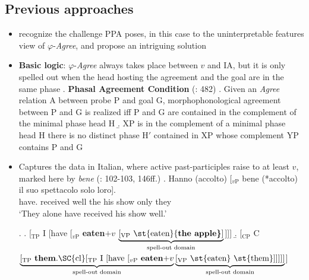 \documentclass[letterpaper,10pt]{handout_nick}
\begin{document}
\subsection{Previous approaches}
\begin{itemize}
\item \citet{dallessandro08} recognize the challenge PPA poses, in this case to the uninterpretable features view of $\varphi$-\emph{Agree}, and propose an intriguing solution
\item {\bf Basic logic}: $\varphi$-\emph{Agree} always takes place between $v$ and IA, but it is only spelled out when the head hosting the agreement and the goal are in the same phase 
\ex. {\bf Phasal Agreement Condition} (\citealt{dallessandro08}: 482)
\a. Given an \emph{Agree} relation A between probe P and goal G, morphophonological agreement between P and G is realized iff P and G are contained in the complement of the minimal phase head H
\b. XP is in the complement of a minimal phase head H there is no distinct phase H$'$ contained in XP whose complement YP contains P and G  

\item Captures the data in Italian, where active past-participles raise to at least $v$, marked here by \emph{bene} (\citealt{cinque99}: 102-103, 146ff.) 
\ex. Hanno (accolto) [$_\text{$v$P}$ bene (*accolto) il suo spettacolo solo loro]. \\
have. received { } well { } the his show only they \\
`They alone have received his show well.'

\ex. \a. [$_\text{TP}$ I [have [$_\text{$v$P}$ {\bf eaten$+v$} $\underbrace{\text{[$_\text{VP}$ \st{eaten} {\bf the apple}]}}_\text{spell-out domain}$]]]
\b. [$_\text{CP}$ C $\underbrace{\text{[$_\text{TP}$ {\bf them}.\SC{cl} [$_\text{TP}$ I [have [$_\text{$v$P}$ {\bf eaten$+v$}}}_\text{spell-out domain} \underbrace{\text{[$_\text{VP}$ \st{eaten} \st{them}]]]]]}}_\text{spell-out domain}$]


\end{itemize}
\end{document}
